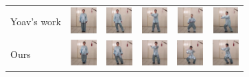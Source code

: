 \documentclass{article}
\begin{document}
\begin{table}[t]
\begin{center}
\begin{small}
\begin{sc}
\begin{tabular}{m{1.5cm}m{1.5cm}m{1.5cm}}
Yoav's work & \includegraphics[width=1cm, height=1cm]{images/4_YOAV_1.JPG} & \includegraphics[width=1cm, height=1cm]{images/4_YOAV_2.JPG} &
\includegraphics[width=1cm, height=1cm]{images/4_YOAV_3.JPG}&
\includegraphics[width=1cm, height=1cm]{images/4_YOAV_4.JPG}&
\includegraphics[width=1cm, height=1cm]{images/4_YOAV_5.JPG}\\
Ours & \includegraphics[width=1cm, height=1cm]{images/5_OURS_1.JPG} & \includegraphics[width=1cm, height=1cm]{images/5_OURS_2.JPG} &
\includegraphics[width=1cm, height=1cm]{images/5_OURS_3.JPG}&
\includegraphics[width=1cm, height=1cm]{images/5_OURS_4.JPG}&
\includegraphics[width=1cm, height=1cm]{images/5_OURS_5.JPG}\\
\bottomrule
\end{tabular}
\end{sc}
\end{small}
\end{center}
\vskip -0.1in
\end{table}
\end{document}
